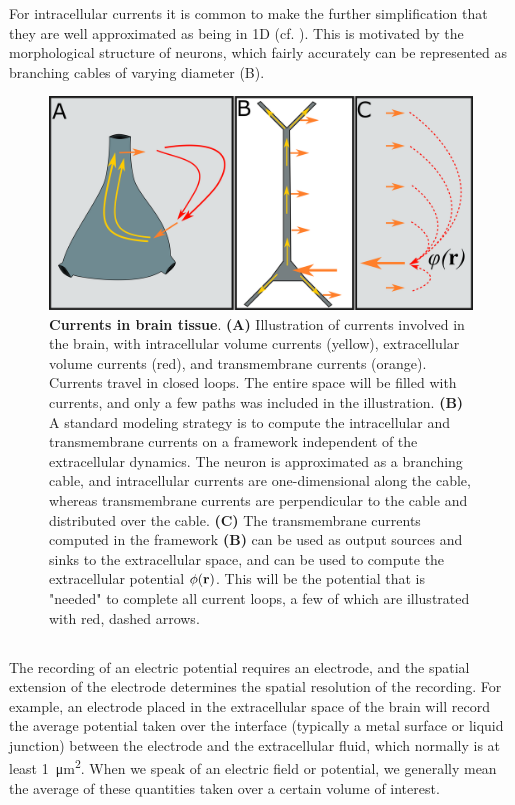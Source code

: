For intracellular currents it is common to make the further simplification that they are well approximated as being in 1D (cf. ). This is motivated by the morphological structure of neurons, which fairly accurately can be represented as branching cables of varying diameter (B).

\begin{figure}[!ht]
\begin{center}
\includegraphics[width=1.0\textwidth]{Figures/Basics/Twostep.png}
\end{center}
\caption{{\bf Currents in brain tissue}. {\bf(A)} Illustration of currents involved in the brain, with intracellular volume currents (yellow), extracellular volume currents (red), and transmembrane currents (orange). Currents travel in closed loops. The entire space will be filled with currents, and only a few paths was included in the illustration. {\bf(B)} A standard modeling strategy is to compute the intracellular and transmembrane currents on a framework independent of the extracellular dynamics. The neuron is approximated as a branching cable, and intracellular currents are one-dimensional along the cable, whereas transmembrane currents are perpendicular to the cable and distributed over the cable. {\bf(C)} The transmembrane currents computed in the framework {\bf(B)} can be used as output sources and sinks to the extracellular space, and can be used to compute the extracellular potential $\phi({\bf r})$. This will be the potential that is "needed" to complete all current loops, a few of which are illustrated with red, dashed arrows.
}
\label{fig:Basics:Twostep}
\end{figure}


\subsection{}
\label{sec:Basics:ECSpot}
The recording of an electric potential requires an electrode, and the spatial extension of the electrode determines the spatial resolution of the recording. For example, an electrode placed in the extracellular space of the brain will record the average potential taken over the interface (typically a metal surface or liquid junction) between the electrode and the extracellular fluid, which normally is at least 1~\si{\square\micro\metre}. When we speak of an electric field or potential, we generally mean the average of these quantities taken over a certain volume of interest. 

